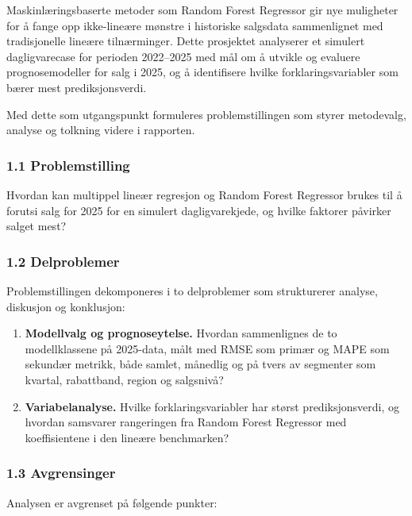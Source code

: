 \documentclass[
  11pt,
]{article}
\providecommand{\tightlist}{%
  \setlength{\itemsep}{0pt}\setlength{\parskip}{0pt}}
\begin{document}
Maskinlæringsbaserte metoder som Random Forest Regressor gir nye muligheter for å fange opp ikke-lineære mønstre i
historiske salgsdata sammenlignet med tradisjonelle lineære tilnærminger. Dette prosjektet analyserer et simulert
dagligvarecase for perioden 2022--2025 med mål om å utvikle og evaluere prognosemodeller for salg i 2025, og å
identifisere hvilke forklaringsvariabler som bærer mest prediksjonsverdi.

Med dette som utgangspunkt formuleres problemstillingen som styrer metodevalg, analyse og tolkning videre i rapporten.

\hypertarget{problemstilling}{%
\subsubsection{1.1 Problemstilling}\label{problemstilling}}

Hvordan kan multippel lineær regresjon og Random Forest Regressor brukes til å forutsi salg for 2025 for en simulert
dagligvarekjede, og hvilke faktorer påvirker salget mest?

\hypertarget{delproblemer}{%
\subsubsection{1.2 Delproblemer}\label{delproblemer}}

Problemstillingen dekomponeres i to delproblemer som strukturerer analyse, diskusjon og konklusjon:

\begin{enumerate}
\def\labelenumi{\arabic{enumi}.}
\tightlist
\item
  \textbf{Modellvalg og prognoseytelse.} Hvordan sammenlignes de to modellklassene på 2025-data, målt med RMSE som
  primær og MAPE som sekundær metrikk, både samlet, månedlig og på tvers av segmenter som kvartal, rabattband, region og
  salgsnivå?
\item
  \textbf{Variabelanalyse.} Hvilke forklaringsvariabler har størst prediksjonsverdi, og hvordan samsvarer rangeringen
  fra Random Forest Regressor med koeffisientene i den lineære benchmarken?
\end{enumerate}

\hypertarget{avgrensinger}{%
\subsubsection{1.3 Avgrensinger}\label{avgrensinger}}

Analysen er avgrenset på følgende punkter:
\end{document}
